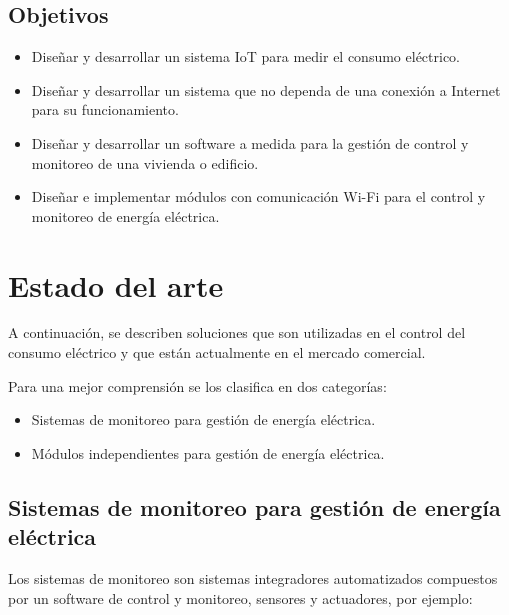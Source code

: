 \subsection{Objetivos}
\begin{itemize}
\item Diseñar y desarrollar un sistema IoT para medir el consumo eléctrico.
\item Diseñar y desarrollar un sistema que no dependa de una conexión a Internet para su funcionamiento.
\item Diseñar y desarrollar un software a medida para la gestión de control y monitoreo de una vivienda o edificio.
\item Diseñar e implementar módulos con comunicación Wi-Fi para el control y monitoreo de energía eléctrica.
\end{itemize}

\section{Estado del arte}

A continuación, se describen soluciones que son utilizadas en el control del consumo eléctrico y que están actualmente en el mercado comercial. 

Para una mejor comprensión se los clasifica en dos categorías:

\begin{itemize}
\item Sistemas de monitoreo para gestión de energía eléctrica.
\item Módulos independientes para gestión de energía eléctrica.
\end{itemize} 

\subsection{Sistemas de monitoreo para gestión de energía eléctrica}
Los sistemas de monitoreo son sistemas integradores automatizados compuestos por un software de control y monitoreo, sensores y actuadores, por ejemplo:

